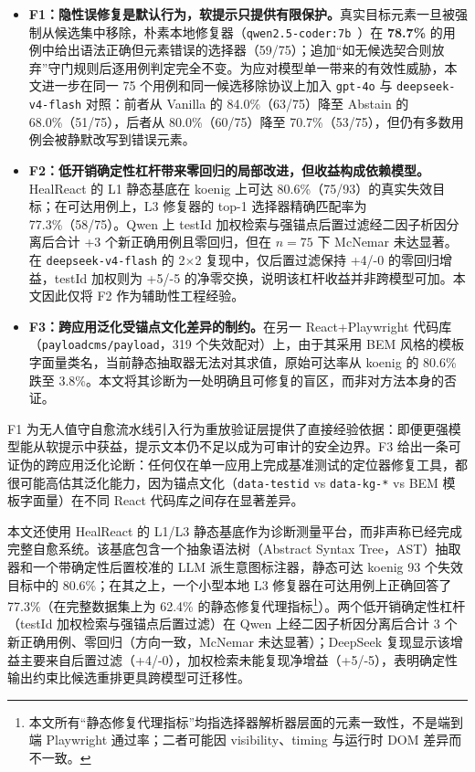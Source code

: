 \begin{itemize}
\item \textbf{F1：隐性误修复是默认行为，软提示只提供有限保护。}真实目标元素一旦被强制从候选集中移除，朴素本地修复器（\texttt{qwen2.5-coder:7b}~\cite{qwenCoderTech2024}）在 \textbf{78.7\%} 的用例中给出语法正确但元素错误的选择器（59/75）；追加“如无候选契合则放弃”守门规则后逐用例判定完全不变。为应对模型单一带来的有效性威胁，本文进一步在同一 75 个用例和同一候选移除协议上加入 \texttt{gpt-4o} 与 \texttt{deepseek-v4-flash} 对照：前者从 Vanilla 的 84.0\%（63/75）降至 Abstain 的 68.0\%（51/75），后者从 80.0\%（60/75）降至 70.7\%（53/75），但仍有多数用例会被静默改写到错误元素。
\item \textbf{F2：低开销确定性杠杆带来零回归的局部改进，但收益构成依赖模型。}HealReact 的 L1 静态基底在 koenig 上可达 80.6\%（75/93）的真实失效目标；在可达用例上，L3 修复器的 top-1 选择器精确匹配率为 77.3\%（58/75）。Qwen 上 testId 加权检索与强锚点后置过滤经二因子析因分离后合计 +3 个新正确用例且零回归，但在 $n=75$ 下 McNemar 未达显著。在 \texttt{deepseek-v4-flash} 的 2$\times$2 复现中，仅后置过滤保持 +4/-0 的零回归增益，testId 加权则为 +5/-5 的净零交换，说明该杠杆收益并非跨模型可加。本文因此仅将 F2 作为辅助性工程经验。
\item \textbf{F3：跨应用泛化受锚点文化差异的制约。}在另一 React+Playwright 代码库（\texttt{payloadcms/payload}，319 个失效配对）上，由于其采用 BEM 风格的模板字面量类名，当前静态抽取器无法对其求值，原始可达率从 koenig 的 80.6\% 跌至 3.8\%。本文将其诊断为一处明确且可修复的盲区，而非对方法本身的否证。
\end{itemize}

\noindent F1 为无人值守自愈流水线引入行为重放验证层提供了直接经验依据：即便更强模型能从软提示中获益，提示文本仍不足以成为可审计的安全边界。F3 给出一条可证伪的跨应用泛化论断：任何仅在单一应用上完成基准测试的定位器修复工具，都很可能高估其泛化能力，因为锚点文化（\texttt{data-testid} vs \texttt{data-kg-*} vs BEM 模板字面量）在不同 React 代码库之间存在显著差异。

本文还使用 HealReact 的 L1/L3 静态基底作为诊断测量平台，而非声称已经完成完整自愈系统。该基底包含一个抽象语法树（Abstract Syntax Tree，AST）抽取器和一个带确定性后置校准的 LLM 派生意图标注器，静态可达 koenig 93 个失效目标中的 80.6\%；在其之上，一个小型本地 L3 修复器在可达用例上正确回答了 77.3\%（在完整数据集上为 62.4\% 的静态修复代理指标\footnote{本文所有“静态修复代理指标”均指选择器解析器层面的元素一致性，不是端到端 Playwright 通过率；二者可能因 visibility、timing 与运行时 DOM 差异而不一致。}）。两个低开销确定性杠杆（testId 加权检索与强锚点后置过滤）在 Qwen 上经二因子析因分离后合计 3 个新正确用例、零回归（方向一致，McNemar 未达显著）；DeepSeek 复现显示该增益主要来自后置过滤（+4/-0），加权检索未能复现净增益（+5/-5），表明确定性输出约束比候选重排更具跨模型可迁移性。

